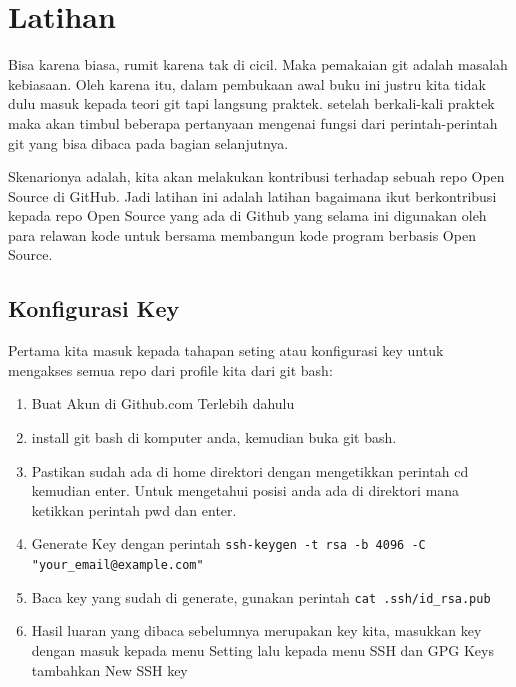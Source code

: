 \section{Latihan}
Bisa karena biasa, rumit karena tak di cicil. Maka pemakaian git adalah masalah kebiasaan. Oleh karena itu, dalam pembukaan awal buku ini justru kita tidak dulu masuk kepada teori git tapi langsung praktek. setelah berkali-kali praktek maka akan timbul beberapa pertanyaan mengenai fungsi dari perintah-perintah git yang bisa dibaca pada bagian selanjutnya.

Skenarionya adalah, kita akan melakukan kontribusi terhadap sebuah repo Open Source di GitHub. Jadi latihan ini adalah latihan bagaimana ikut berkontribusi kepada repo Open Source yang ada di Github yang selama ini digunakan oleh para relawan kode untuk bersama membangun kode program berbasis Open Source.
\subsection{Konfigurasi Key}
Pertama kita masuk kepada tahapan seting atau konfigurasi key untuk mengakses semua repo dari profile kita dari git bash:
\begin{enumerate}
\item Buat Akun di Github.com Terlebih dahulu
\item install git bash di komputer anda, kemudian buka git bash.
\item Pastikan sudah ada di home direktori dengan mengetikkan perintah cd kemudian enter. Untuk mengetahui posisi anda ada di direktori mana ketikkan perintah pwd dan enter.
\item Generate Key dengan perintah
\verb|ssh-keygen -t rsa -b 4096 -C "your_email@example.com"|
\item Baca key yang sudah di generate, gunakan perintah
\verb|cat .ssh/id_rsa.pub|
\item Hasil luaran yang dibaca sebelumnya merupakan key kita, masukkan key dengan masuk kepada menu Setting  lalu kepada menu SSH dan GPG Keys tambahkan New SSH key
\end{enumerate}

